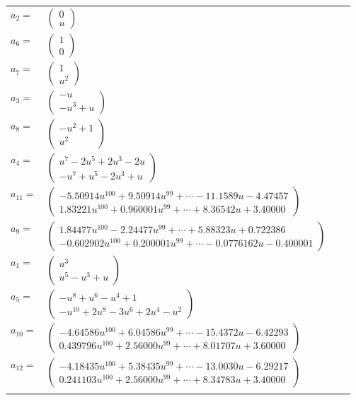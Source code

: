 \documentclass[1p]{elsarticle_modified}
\theoremstyle{definition}
\begin{document}
\begin{tabular}{m{7pt} m{180pt} m{7pt} m{180pt} }
\flushright $a_{2}=$&$\begin{pmatrix}0\\u\end{pmatrix}$ \\
\flushright $a_{6}=$&$\begin{pmatrix}1\\0\end{pmatrix}$ \\
\flushright $a_{7}=$&$\begin{pmatrix}1\\u^2\end{pmatrix}$ \\
\flushright $a_{3}=$&$\begin{pmatrix}- u\\- u^3+u\end{pmatrix}$ \\
\flushright $a_{8}=$&$\begin{pmatrix}- u^2+1\\u^2\end{pmatrix}$ \\
\flushright $a_{4}=$&$\begin{pmatrix}u^7-2 u^5+2 u^3-2 u\\- u^7+u^5-2 u^3+u\end{pmatrix}$ \\
\flushright $a_{11}=$&$\begin{pmatrix}-5.50914 u^{100}+9.50914 u^{99}+\cdots-11.1589 u-4.47457\\1.83221 u^{100}+0.960001 u^{99}+\cdots+8.36542 u+3.40000\end{pmatrix}$ \\
\flushright $a_{9}=$&$\begin{pmatrix}1.84477 u^{100}-2.24477 u^{99}+\cdots+5.88323 u+0.722386\\-0.602902 u^{100}+0.200001 u^{99}+\cdots-0.0776162 u-0.400001\end{pmatrix}$ \\
\flushright $a_{1}=$&$\begin{pmatrix}u^3\\u^5- u^3+u\end{pmatrix}$ \\
\flushright $a_{5}=$&$\begin{pmatrix}- u^8+u^6- u^4+1\\- u^{10}+2 u^8-3 u^6+2 u^4- u^2\end{pmatrix}$ \\
\flushright $a_{10}=$&$\begin{pmatrix}-4.64586 u^{100}+6.04586 u^{99}+\cdots-15.4372 u-6.42293\\0.439796 u^{100}+2.56000 u^{99}+\cdots+8.01707 u+3.60000\end{pmatrix}$ \\
\flushright $a_{12}=$&$\begin{pmatrix}-4.18435 u^{100}+5.38435 u^{99}+\cdots-13.0030 u-6.29217\\0.241103 u^{100}+2.56000 u^{99}+\cdots+8.34783 u+3.40000\end{pmatrix}$\\&\end{tabular}
\end{document}
